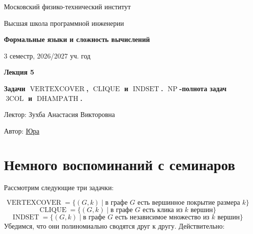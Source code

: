 \documentclass[11pt]{article}
\DeclareMathOperator{\trCOL}{3COL}
\DeclareMathOperator{\VERTEXCOVER}{VERTEXCOVER}
\DeclareMathOperator{\DHAMPATH}{DHAMPATH}
\DeclareMathOperator{\CLIQUE}{CLIQUE}
\DeclareMathOperator{\INDSET}{INDSET}
\DeclareMathOperator{\NP}{NP}
\newcommand{\lectureNumber}{5}
\newcommand{\lectureTitle}{Задачи $\VERTEXCOVER$, $\CLIQUE$ и $\INDSET$. $\NP$-полнота задач $\trCOL$ и $\DHAMPATH$.}
\newcommand{\courseName}{Формальные языки и сложность вычислений}
\newcommand{\semester}{3 семестр, 2026/2027 уч. год}
\begin{document}
\begin{titlepage}
    \centering
    
    {\large Московский физико-технический институт \par}
    {\large Высшая школа программной инженерии \par}
    \vspace{2cm}

    {\Large \textbf{\courseName} \par}
    {\large \semester \par}
    
    \vspace*{\fill}

    {\Huge \textbf{Лекция \lectureNumber} \par}
    {\Huge \textbf{\lectureTitle} \par}
    
    \vspace*{\fill}
    
    {\large Лектор: Зухба Анастасия Викторовна \par}
    {\large Автор: \href{https://t.me/ceagest}{Юра} \par}

\end{titlepage}


\section{Немного воспоминаний с семинаров}

Рассмотрим следующие три задачки:

\[\VERTEXCOVER = \{(G, k) \; | \; \text{в графе } G \text{ есть вершинное покрытие размера } k\}\]
\[\CLIQUE = \{(G, k) \; | \; \text{в графе } G \text{ есть клика из } k \text{ вершин}\}\]
\[\INDSET = \{(G, k) \; | \; \text{в графе } G \text{ есть независимое множество из } k \text{ вершин}\}\]
Убедимся, что они полиномиально сводятся друг к другу. Действительно:
\end{document}
